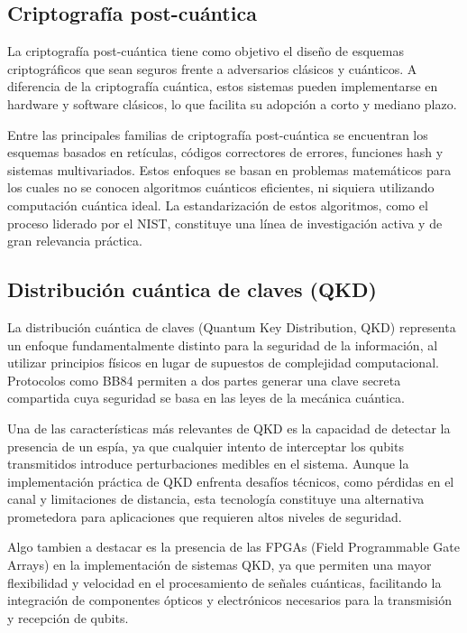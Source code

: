 \documentclass[12pt]{article}
\begin{document}
\subsection{Criptografía post-cuántica}

La criptografía post-cuántica tiene como objetivo el diseño de esquemas criptográficos que sean seguros frente a adversarios clásicos y cuánticos. A diferencia de la criptografía cuántica, estos sistemas pueden implementarse en hardware y software clásicos, lo que facilita su adopción a corto y mediano plazo.

Entre las principales familias de criptografía post-cuántica se encuentran los esquemas basados en retículas, códigos correctores de errores, funciones hash y sistemas multivariados. Estos enfoques se basan en problemas matemáticos para los cuales no se conocen algoritmos cuánticos eficientes, ni siquiera utilizando computación cuántica ideal. La estandarización de estos algoritmos, como el proceso liderado por el NIST, constituye una línea de investigación activa y de gran relevancia práctica.

\subsection{Distribución cuántica de claves (QKD)}

La distribución cuántica de claves (Quantum Key Distribution, QKD) representa un enfoque fundamentalmente distinto para la seguridad de la información, al utilizar principios físicos en lugar de supuestos de complejidad computacional. Protocolos como BB84 permiten a dos partes generar una clave secreta compartida cuya seguridad se basa en las leyes de la mecánica cuántica.

Una de las características más relevantes de QKD es la capacidad de detectar la presencia de un espía, ya que cualquier intento de interceptar los qubits transmitidos introduce perturbaciones medibles en el sistema. Aunque la implementación práctica de QKD enfrenta desafíos técnicos, como pérdidas en el canal y limitaciones de distancia, esta tecnología constituye una alternativa prometedora para aplicaciones que requieren altos niveles de seguridad.

Algo tambien a destacar es la presencia de las FPGAs (Field Programmable Gate Arrays) en la implementación de sistemas QKD, ya que permiten una mayor flexibilidad y velocidad en el procesamiento de señales cuánticas, facilitando la integración de componentes ópticos y electrónicos necesarios para la transmisión y recepción de qubits.
\cite{quantumFPGA}
\end{document}
